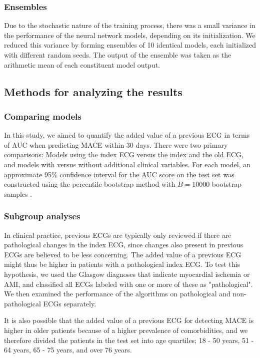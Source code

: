 \documentclass[preprint]{elsarticle}
\begin{document}
\subsubsection{Ensembles}
Due to the stochastic nature of the training process, there was a small variance in the performance of the neural network models, depending on its initialization. We reduced this variance by forming ensembles of 10 identical models, each initialized with different random seeds. The output of the ensemble was taken as the arithmetic mean of each constituent model output.

\subsection{Methods for analyzing the results}
\subsubsection{Comparing models}
In this study, we aimed to quantify the added value of a previous ECG in terms of AUC  when predicting MACE within 30 days. There were two primary comparisons: Models using the index ECG versus the index and the old ECG, and models with versus without additional clinical variables. For each model, an approximate 95\% confidence interval for the AUC score on the test set was constructed using the percentile bootstrap method with $B=10000$ bootstrap samples \citep{efron1981}.

\subsubsection{Subgroup analyses}
In clinical practice, previous ECGs are typically only reviewed if there are pathological changes in the index ECG, since changes also present in previous ECGs are believed to be less concerning. The added value of a previous ECG might thus be higher in patients with a pathological index ECG. To test this hypothesis, we used the Glasgow diagnoses that indicate myocardial ischemia or AMI, and classified all ECGs labeled with one or more of these as "pathological". We then examined the performance of the algorithms on pathological and non-pathological ECGs separately. 

It is also possible that the added value of a previous ECG for detecting MACE is higher in older patients because of a higher prevalence of comorbidities, and we therefore divided the patients in the test set into age quartiles; 18 - 50 years, 51 - 64 years, 65 - 75 years, and over 76 years.
\end{document}
